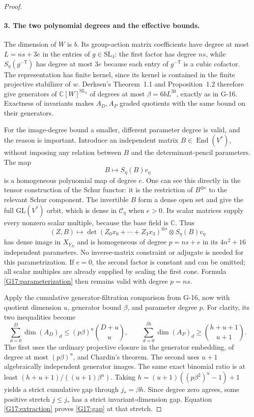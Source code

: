 \begin{proof}
\paragraph{3. The two polynomial degrees and the effective bounds.}
The dimension of $W$ is $b$. Its group-action matrix coefficients
have degree at most $L=ns+3e$ in the entries of $g\in\mathrm{SL}_4$:
the first factor has degree $ns$, while $S_\eta(g^{-\mathsf T})$
has degree at most $3e$ because each entry of $g^{-\mathsf T}$ is
a cubic cofactor. The representation has finite kernel, since its
kernel is contained in the finite projective stabilizer of $w$.
Derksen's Theorem~1.1 and Proposition~1.2 therefore give generators
of $\mathbb C[W]^{\mathrm{SL}_4}$ of degrees at most
$\beta=6bL^{30}$, exactly as in G-16. Exactness of invariants makes
$A_D,A_P$ graded quotients with the same bound on their generators.

For the image-degree bound a smaller, different parameter degree
is valid, and the reason is important. Introduce an independent
matrix $B\in\operatorname{End}(V^*)$, without imposing any relation
between $B$ and the determinant-pencil parameters. The map
\[
 B\longmapsto S_\eta(B)v_\eta
\]
is a homogeneous polynomial map of degree $e$. One can see this
directly in the tensor construction of the Schur functor: it is
the restriction of $B^{\otimes e}$ to the relevant Schur component.
The invertible $B$ form a dense open set and give the full
$\mathrm{GL}(V^*)$ orbit, which is dense in $\mathcal C_\eta$
when $e>0$. Its scalar matrices supply every nonzero scalar
multiple, because the base field is $\mathbb C$.
Thus
\begin{equation}\label{G17:parameterization}
 (Z,B)\longmapsto
  \det(Z_0x_0+\cdots+Z_3x_3)^{\otimes s}
       \otimes S_\eta(B)v_\eta
\end{equation}
has dense image in $X_{Y_D}$ and is homogeneous of degree
$p=ns+e$ in its $4n^2+16$ independent parameters.
No inverse-matrix constraint or adjugate is needed for this
parametrization. If $e=0$, the second factor is constant and can
be omitted; all scalar multiples are already supplied by scaling
the first cone. Formula \eqref{G17:parameterization} then remains
valid with degree $p=ns$.

Apply the cumulative generator-filtration comparison from G-16,
now with quotient dimension $u$, generator bound $\beta$, and
parameter degree $p$. For clarity, its two inequalities become
\[
 \sum_{d=0}^{D}\dim(A_D)_d
       \leq(p\beta)^u\binom{D+u}{u},\qquad
 \sum_{d=0}^{\beta h}\dim(A_P)_d
       \geq\binom{h+u+1}{u+1}.
\]
The first uses the ordinary projective closure in the generator
embedding, of degree at most $(p\beta)^u$, and Chardin's theorem.
The second uses $u+1$ algebraically independent generator images.
The same exact binomial ratio is at least
$(h+u+1)/((u+1)\beta^u)$. Taking
$h=(u+1)((p\beta^2)^u-1)+1$ yields a strict cumulative gap through
$j_*=\beta h$. Since degree zero agrees, some positive stretch
$j\leq j_*$ has a strict invariant-dimension gap. Equation
\eqref{G17:extraction} proves \eqref{G17:gap} at that stretch.


\end{proof}
